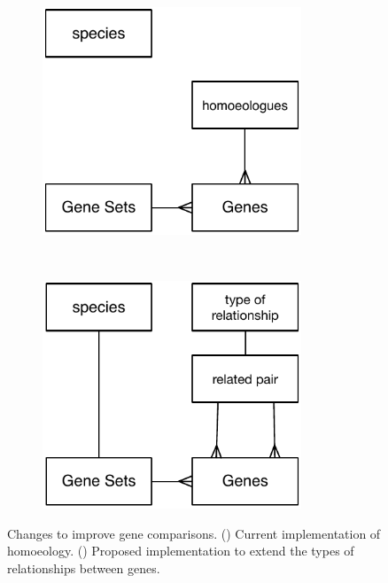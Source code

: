 \begin{figure}
\centering
\begin{subfigure}{0.45\textwidth}
\centering
\caption{}
\label{fig:exp:currentGeneRelations}
\includegraphics[width=0.85\textwidth]{expVIP/Figures/currentGeneRelations.pdf}
\end{subfigure}
~
\begin{subfigure}{0.45\textwidth}
\centering
\caption{}
\label{fig:exp:futureGeneRelations}
\includegraphics[width=0.85\textwidth]{expVIP/Figures/futureGeneRelations.pdf}
\end{subfigure}
\caption[Changes to improve gene comparisons]{Changes to improve gene comparisons. () Current implementation of homoeology. () Proposed implementation to extend the types of relationships between genes.  }
\end{figure}

